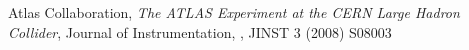\begin{thebibliography}{99}
 Atlas Collaboration, \textit{The {ATLAS} Experiment at the {CERN} Large Hadron Collider}, Journal of Instrumentation, , JINST 3 (2008) S08003
\end{thebibliography}